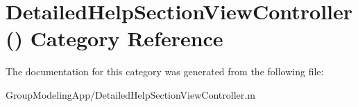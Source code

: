 \hypertarget{category_detailed_help_section_view_controller_07_08}{\section{Detailed\-Help\-Section\-View\-Controller() Category Reference}
\label{category_detailed_help_section_view_controller_07_08}
}


The documentation for this category was generated from the following file\-:\begin{DoxyCompactItemize}
\item 
Group\-Modeling\-App/Detailed\-Help\-Section\-View\-Controller.\-m\end{DoxyCompactItemize}
